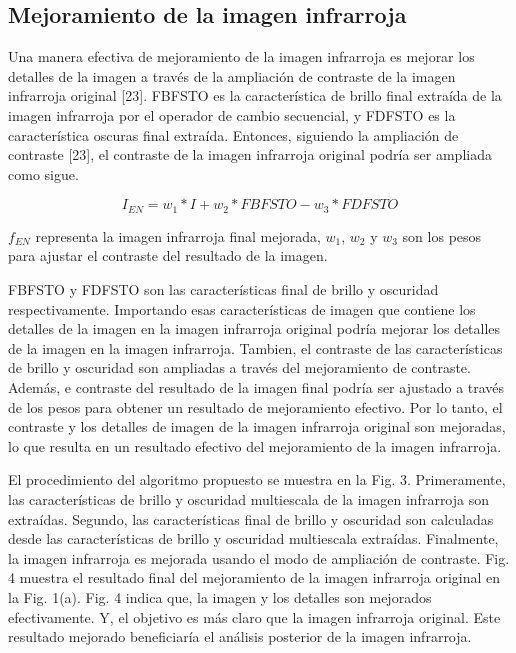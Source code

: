 \documentclass[a4paper, 11 pt, conference]{ieeeconf}      %
\begin{document}
\subsection{Mejoramiento de la imagen infrarroja}

Una manera efectiva de mejoramiento de la imagen infrarroja es mejorar los detalles de la imagen a trav\'es de la ampliaci\'on de contraste de la imagen infrarroja original [23]. FBFSTO es la caracter\'istica de brillo final extra\'ida de la imagen infrarroja por el operador de cambio secuencial, y FDFSTO es la caracter\'istica oscuras final extra\'ida. Entonces, siguiendo la ampliaci\'on de contraste [23], el contraste de la imagen infrarroja original podr\'ia ser ampliada como sigue. 

$$
I_{EN} = w_1  *  I + w_2 * FBFSTO - w_3 *FDFSTO
$$

$f_{EN}$ representa la imagen infrarroja final mejorada, $w_1$, $w_2$ y $w_3$ son los pesos para ajustar el contraste del resultado de la imagen.

FBFSTO y FDFSTO son las caracter\'isticas final de brillo y oscuridad respectivamente. Importando esas caracter\'isticas de imagen que contiene los detalles de la imagen en la imagen infrarroja original podr\'ia mejorar los detalles de la imagen en la imagen infrarroja. Tambien, el contraste de las caracter\'isticas de brillo y oscuridad son ampliadas a trav\'es del mejoramiento de contraste. Adem\'as, e contraste del resultado de la imagen final  podr\'ia ser ajustado a trav\'es de los pesos para obtener un resultado de mejoramiento efectivo. Por lo tanto, el contraste y los detalles de imagen de la imagen infrarroja original son mejoradas, lo que resulta en un resultado efectivo del mejoramiento de la imagen infrarroja.

El procedimiento del algoritmo propuesto se muestra en la Fig. 3. Primeramente, las caracter\'isticas de brillo y oscuridad multiescala de la imagen infrarroja son extra\'idas. Segundo, las caracter\'isticas final de brillo y oscuridad son calculadas desde las caracter\'isticas de brillo y oscuridad multiescala extra\'idas. Finalmente, la imagen infrarroja es mejorada usando el modo de ampliaci\'on de contraste. Fig. 4 muestra el resultado final del mejoramiento de la imagen infrarroja original en la Fig. 1(a). Fig. 4 indica que, la imagen y los detalles son mejorados efectivamente. Y, el objetivo es m\'as claro que la imagen infrarroja original. Este resultado mejorado beneficiar\'ia el an\'alisis posterior de la imagen infrarroja.
\end{document}
